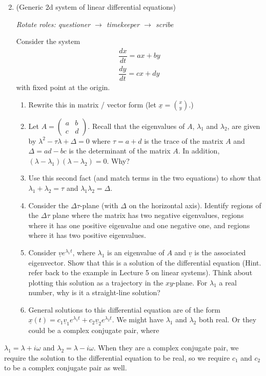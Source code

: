 \documentclass[12pt]{amsart}
\theoremstyle{conjecture}
\theoremstyle{definition}
\theoremstyle{question}
\theoremstyle{theorem}
\newcommand{\vct}[1]{\underline{#1}}
\newcommand{\sys}[2]{\begin{aligned}#1\\#2\end{aligned}}
\begin{document}
    \begin{enumerate}\setcounter{enumi}{1}
        \item (Generic 2d system of linear differential equations)

        \emph{Rotate roles: questioner $\to$ timekeeper $\to$ scribe}

        Consider the system
        \[\sys{\dfrac{dx}{dt}=ax+by}{\dfrac{dy}{dt}=cx+dy}\]
        with fixed point at the origin.
        \begin{enumerate}
            \item Rewrite this in matrix / vector form (let $\vct{x}=\binom{x}{y}$.)
            \item Let $A=\begin{pmatrix}a&b\\c&d\end{pmatrix}$. Recall that the eigenvalues of $A$, $\lambda_1$ and $\lambda_2$, are given by $\lambda^2-\tau\lambda+\Delta=0$ where $\tau=a+d$ is the trace of the matrix $A$ and $\Delta=ad-bc$ is the determinant of the matrix $A$. In addition, $(\lambda-\lambda_1)(\lambda-\lambda_2)=0$. Why?
            \item Use this second fact (and match terms in the two equations) to show that $\lambda_1+\lambda_2=\tau$ and $\lambda_1\lambda_2=\Delta$.
            \item Consider the $\Delta\tau$-plane (with $\Delta$ on the horizontal axis). Identify regions of the $\Delta\tau$ plane where the matrix has two negative eigenvalues, regions where it has one positive eigenvalue and one negative one, and regions where it has two positive eigenvalues.
            \item Consider $\vct{v}e^{\lambda_1t}$, where $\lambda_1$ is an eigenvalue of $A$ and $\vct{v}$ is the associated eigenvector. Show that this is a solution of the differential equation (Hint. refer back to the example in Lecture 5 on linear systems). Think about plotting this solution as a trajectory in the $xy$-plane. For $\lambda_1$ a real number, why is it a straight-line solution?
            \item General solutions to this differential equation are of the form $\vct{x}(t)=c_1\vct{v}_1e^{\lambda_1t}+c_2\vct{v}_2e^{\lambda_2t}$. We might have $\lambda_1$ and $\lambda_2$ both real. Or they could be a complex conjugate pair, where
        \end{enumerate}
    \end{enumerate}

    $\lambda_1=\lambda+i\omega$ and $\lambda_2=\lambda-i\omega$. When they are a complex conjugate pair, we require the solution to the differential equation to be real, so we require $c_1$ and $c_2$ to be a complex conjugate pair as well.
\end{document}
